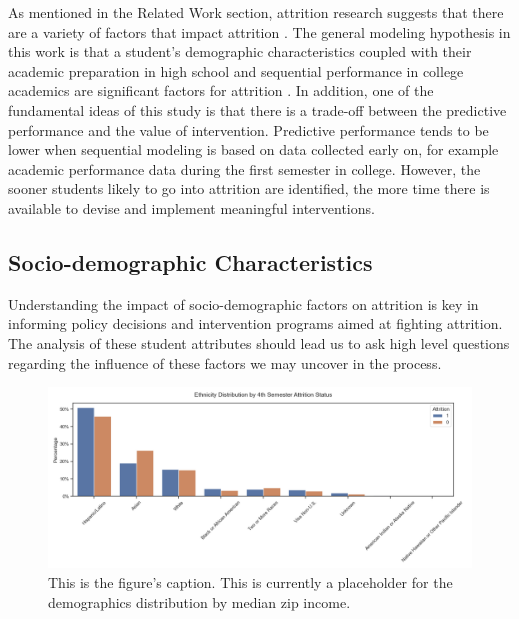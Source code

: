 \documentclass[notitlepage,12pt]{jedm}
\begin{document}
\par As mentioned in the Related Work section, attrition research suggests that there are a variety of factors that impact attrition \cite{alvarez2021academic}. The general modeling hypothesis in this work is that a student's demographic characteristics coupled with their academic preparation in high school and sequential performance in college academics are significant factors for attrition \cite{tinto2006research}. In addition, one of the fundamental ideas of this study is that there is a trade-off between the predictive performance and the value of intervention. Predictive performance tends to be lower when sequential modeling is based on data collected early on, for example academic performance data during the first semester in college. However, the sooner students likely to go into attrition are identified, the more time there is available to devise and implement meaningful interventions.



\subsection{Socio-demographic Characteristics}
\par Understanding the impact of socio-demographic factors on attrition is key in informing policy decisions and intervention programs aimed at fighting attrition. The analysis of these student attributes should lead us to ask high level questions regarding the influence of these factors we may uncover in the process. 

\begin{figure}[h!]
\centering
  \includegraphics[scale=.45]{ethnicity_attrition_4th_semester.png} 
  \caption{This is the figure's caption.  This is currently a placeholder for the demographics distribution by median zip income.}
  \label{fig:fig1}
\end{figure}
\end{document}
